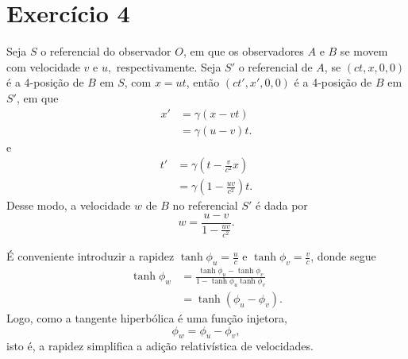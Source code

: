 \section*{Exercício 4}
Seja \(S\) o referencial do observador \(O\), em que os observadores \(A\) e \(B\) se movem com velocidade \(v\) e \(u,\) respectivamente. Seja \(S'\) o referencial de \(A\), se \((ct, x, 0, 0)\) é a 4-posição de \(B\) em \(S\), com \(x = ut\), então \((ct', x', 0, 0)\) é a 4-posição de \(B\) em \(S'\), em que
\begin{align*}
    x' &= \gamma \left(x - vt\right)\\
       &= \gamma (u - v)t.
\end{align*}
e
\begin{align*}
    t' &= \gamma \left(t - \frac{v}{c^2}x\right)\\
       &= \gamma \left(1 - \frac{uv}{c^2}\right)t.
\end{align*}
Desse modo, a velocidade \(w\) de \(B\) no referencial \(S'\) é dada por
\begin{equation*}
    w = \frac{u - v}{1 - \frac{uv}{c^2}}.
\end{equation*}


É conveniente introduzir a rapidez \(\tanh \phi_u = \frac{u}{c}\) e \(\tanh \phi_v = \frac{v}{c}\), donde segue
\begin{align*}
    \tanh \phi_w &= \frac{\tanh \phi_u - \tanh \phi_v}{1 - \tanh \phi_u \tanh \phi_v}\\
                 &= \tanh\left(\phi_u - \phi_v\right).
\end{align*}
Logo, como a tangente hiperbólica é uma função injetora,
\begin{equation*}
    \phi_w = \phi_u - \phi_v,
\end{equation*}
isto é, a rapidez simplifica a adição relativística de velocidades.

